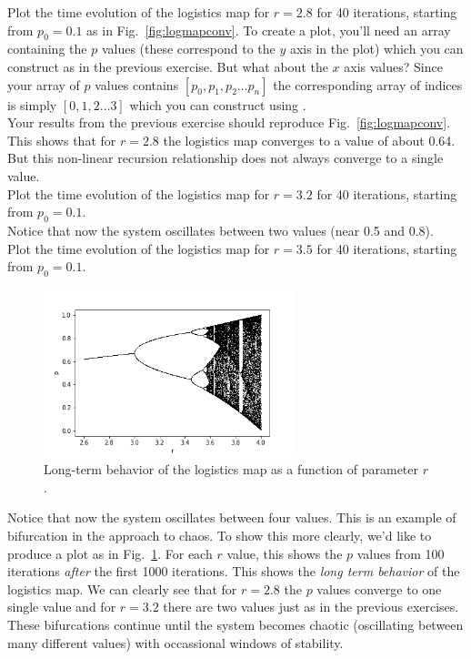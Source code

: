\plot Plot the time evolution of the logistics map for $r=2.8$ for 40
iterations, starting from $p_0=0.1$ as in Fig.~\ref{fig:logmapconv}.
To create a plot, you'll need an array containing the $p$ values
(these correspond to the $y$ axis in the plot) which you can construct
as in the previous exercise.  But what about the $x$ axis values?
Since your array of $p$ values contains $[p_0, p_1, p_2 \ldots p_n]$
the corresponding array of indices is simply $[0,1,2 \ldots 3]$ which
you can construct using .\\

Your results from the previous exercise should reproduce
Fig.~\ref{fig:logmapconv}.  This shows that for $r=2.8$ the logistics
map converges to a value of about 0.64.  But this non-linear recursion
relationship does not always converge to a single value.\\

\plot Plot the time evolution of the logistics map for $r=3.2$ for 40
iterations, starting from $p_0=0.1$.\\

Notice that now the system oscillates between two values (near 0.5 and 0.8).\\

\plot Plot the time evolution of the logistics map for $r=3.5$ for 40
iterations, starting from $p_0=0.1$.\\

\begin{figure}[htbp]
\begin{center}
\includegraphics[width=0.65\textwidth]{figs/plotting/logmap.png} 
\caption{Long-term behavior of the logistics map as a function of parameter $r$.}
\label{fig:logmap}
\end{center}
\end{figure}

Notice that now the system oscillates between four values.  This is an
example of bifurcation in the approach to chaos.  To show this more
clearly, we'd like to produce a plot as in Fig.~\ref{fig:logmap}.  For
each $r$ value, this shows the $p$ values from 100 iterations {\em
  after} the first 1000 iterations.  This shows the {\em long term
  behavior} of the logistics map.  We can clearly see that for $r=2.8$
the $p$ values converge to one single value and for $r=3.2$ there are
two values just as in the previous exercises.  These bifurcations
continue until the system becomes chaotic (oscillating between many
different values) with occassional windows of stability.


